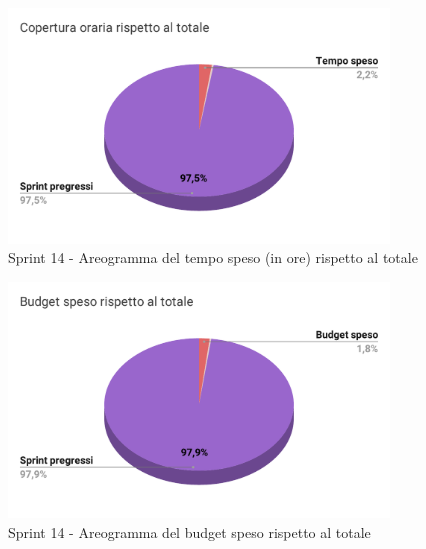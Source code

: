   \begin{figure}[H]
    \centering
    \includegraphics[width=0.90\textwidth]{assets/Consuntivo/Sprint-14/copertura_oraria.pdf}
    \caption{Sprint 14 - Areogramma del tempo speso (in ore) rispetto al totale}
  \end{figure}

  \begin{figure}[H]
    \centering
    \includegraphics[width=0.90\textwidth]{assets/Consuntivo/Sprint-14/budget_speso.pdf}
    \caption{Sprint 14 - Areogramma del budget speso rispetto al totale}
  \end{figure}

